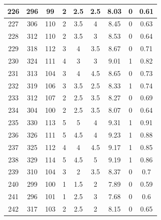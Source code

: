\documentclass[11pt]{article}
\begin{document}
\begin{appendix}
\begin{longtable}[H]{|c|c|c|c|c|c|c|c|c|}
	226        & 296       & 99          & 2                 & 2.5 & 2.5 & 8.03 & 0        & 0.61            \\ \hline
	227        & 306       & 110         & 2                 & 3.5 & 4   & 8.45 & 0        & 0.63            \\ \hline
	228        & 312       & 110         & 2                 & 3.5 & 3   & 8.53 & 0        & 0.64            \\ \hline
	229        & 318       & 112         & 3                 & 4   & 3.5 & 8.67 & 0        & 0.71            \\ \hline
	230        & 324       & 111         & 4                 & 3   & 3   & 9.01 & 1        & 0.82            \\ \hline
	231        & 313       & 104         & 3                 & 4   & 4.5 & 8.65 & 0        & 0.73            \\ \hline
	232        & 319       & 106         & 3                 & 3.5 & 2.5 & 8.33 & 1        & 0.74            \\ \hline
	233        & 312       & 107         & 2                 & 2.5 & 3.5 & 8.27 & 0        & 0.69            \\ \hline
	234        & 304       & 100         & 2                 & 2.5 & 3.5 & 8.07 & 0        & 0.64            \\ \hline
	235        & 330       & 113         & 5                 & 5   & 4   & 9.31 & 1        & 0.91            \\ \hline
	236        & 326       & 111         & 5                 & 4.5 & 4   & 9.23 & 1        & 0.88            \\ \hline
	237        & 325       & 112         & 4                 & 4   & 4.5 & 9.17 & 1        & 0.85            \\ \hline
	238        & 329       & 114         & 5                 & 4.5 & 5   & 9.19 & 1        & 0.86            \\ \hline
	239        & 310       & 104         & 3                 & 2   & 3.5 & 8.37 & 0        & 0.7             \\ \hline
	240        & 299       & 100         & 1                 & 1.5 & 2   & 7.89 & 0        & 0.59            \\ \hline
	241        & 296       & 101         & 1                 & 2.5 & 3   & 7.68 & 0        & 0.6             \\ \hline
	242        & 317       & 103         & 2                 & 2.5 & 2   & 8.15 & 0        & 0.65            \\ \hline

\end{longtable}
\end{appendix}
\end{document}

